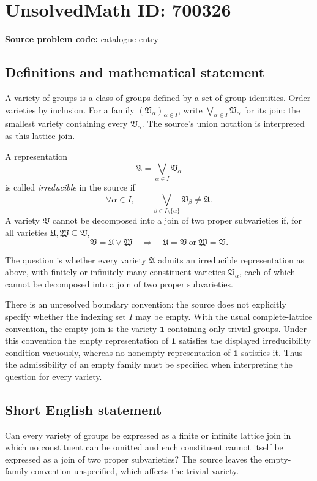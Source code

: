 \documentclass[11pt]{article}
\begin{document}
\section*{UnsolvedMath ID: 700326}
\textbf{Source problem code:} catalogue entry
\subsection{Definitions and mathematical statement}
A variety of groups is a class of groups defined by a set of group identities. Order varieties by inclusion. For a family \((\mathfrak V_\alpha)_{\alpha\in I}\), write \(\bigvee_{\alpha\in I}\mathfrak V_\alpha\) for its join: the smallest variety containing every \(\mathfrak V_\alpha\). The source's union notation is interpreted as this lattice join.

A representation
\[
\mathfrak A=\bigvee_{\alpha\in I}\mathfrak V_\alpha
\]
is called \emph{irreducible} in the source if
\[
\forall\alpha\in I,\qquad
\bigvee_{\beta\in I\setminus\{\alpha\}}\mathfrak V_\beta\ne\mathfrak A.
\]
A variety \(\mathfrak V\) cannot be decomposed into a join of two proper subvarieties if, for all varieties \(\mathfrak U,\mathfrak W\subseteq\mathfrak V\),
\[
\mathfrak V=\mathfrak U\vee\mathfrak W
\quad\Longrightarrow\quad
\mathfrak U=\mathfrak V\ \text{or}\ \mathfrak W=\mathfrak V.
\]

The question is whether every variety \(\mathfrak A\) admits an irreducible representation as above, with finitely or infinitely many constituent varieties \(\mathfrak V_\alpha\), each of which cannot be decomposed into a join of two proper subvarieties.

There is an unresolved boundary convention: the source does not explicitly specify whether the indexing set \(I\) may be empty. With the usual complete-lattice convention, the empty join is the variety \(\mathbf 1\) containing only trivial groups. Under this convention the empty representation of \(\mathbf 1\) satisfies the displayed irreducibility condition vacuously, whereas no nonempty representation of \(\mathbf 1\) satisfies it. Thus the admissibility of an empty family must be specified when interpreting the question for every variety.
\subsection{Short English statement}
Can every variety of groups be expressed as a finite or infinite lattice join in which no constituent can be omitted and each constituent cannot itself be expressed as a join of two proper subvarieties? The source leaves the empty-family convention unspecified, which affects the trivial variety.
\end{document}
